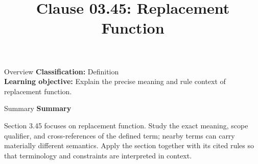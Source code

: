 \documentclass[10pt,letterpaper]{article}
\title{Clause 03.45: Replacement Function}
\author{}
\date{}
\begin{document}
\maketitle
\begin{CornellOverviewBox}{Overview}
\textbf{Classification:} Definition\\[2pt]
\textbf{Learning objective:} Explain the precise meaning and rule context of replacement function.
\end{CornellOverviewBox}\begin{CornellSummaryBox}{Summary}
{\sffamily\bfseries\color{Accent} Summary}\par\vspace{3pt}Section 3.45 focuses on replacement function. Study the exact meaning, scope qualifier, and cross-references of the defined term; nearby terms can carry materially different semantics. Apply the section together with its cited rules so that terminology and constraints are interpreted in context.
\end{CornellSummaryBox}
\end{document}
